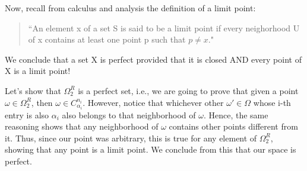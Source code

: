 \documentclass{article}
\begin{document}
Now, recall from calculus and analysis the definition of a limit point:
\begin{quote}
  ``An element x of a set S is said to be a limit point if every neighorhood U of x contains at least one point
  p such that $p\neq{x}.$"  
\end{quote}
We conclude that a set X is perfect provided that it is closed AND every point of X is a limit point! 

Let's show that $\Omega _{2} ^{R}$ is a perfect set, i.e., we are going to prove that given a point $\omega\in\Omega _{2}^{R}$,
then $\omega\in{C _{\alpha_i}^{n_i}}.$ However, notice that whichever other $\omega'\in\Omega$ whose i-th entry is also
$\alpha_i$ also belongs to that neighborhood of $\omega$. Hence, the same reasoning shows that any neighborhood of
$\omega$ contains other points different from it. Thus, since our point was arbitrary, this is true for any element
of $\Omega _{2}^{R}$, showing that any point is a limit point. We conclude from this that our space is perfect.
\end{document}
